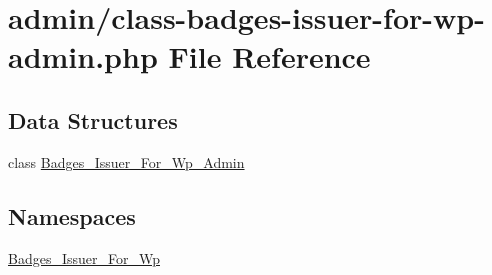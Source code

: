 \hypertarget{class-badges-issuer-for-wp-admin_8php}{}\section{admin/class-\/badges-\/issuer-\/for-\/wp-\/admin.php File Reference}
\label{class-badges-issuer-for-wp-admin_8php}
\subsection*{Data Structures}
\begin{DoxyCompactItemize}
\item 
class \hyperlink{class_badges___issuer___for___wp___admin}{Badges\+\_\+\+Issuer\+\_\+\+For\+\_\+\+Wp\+\_\+\+Admin}
\end{DoxyCompactItemize}
\subsection*{Namespaces}
\begin{DoxyCompactItemize}
\item 
 \hyperlink{namespace_badges___issuer___for___wp}{Badges\+\_\+\+Issuer\+\_\+\+For\+\_\+\+Wp}
\end{DoxyCompactItemize}
